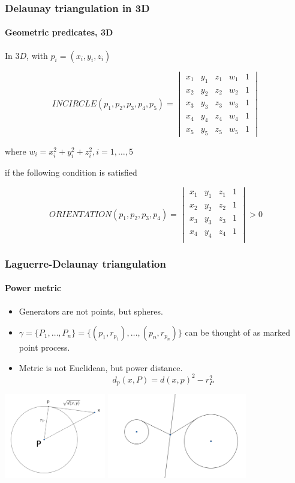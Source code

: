 \documentclass[c, 10pt]{beamer}
\begin{document}
\begin{frame}\frametitle{Delaunay triangulation in 3D}\framesubtitle{Geometric predicates, 3D}

In $3D$, with $p_i = ( x_i, y_i, z_i)$

$$INCIRCLE(p_1,p_2,p_3,p_4, p_5) = \begin{vmatrix} x_1 & y_1 & z_1 & w_1 & 1 \\
x_2 & y_2 & z_2 & w_2 & 1 \\
x_3 & y_3 & z_3 & w_3 & 1 \\
x_4 & y_4 & z_4 & w_4 & 1 \\
x_5 & y_5 & z_5 & w_5 & 1\end{vmatrix}$$

where $w_i = x_i^2  + y_i^2 + z_i^2, i = 1,\dots, 5$

if the following condition is satisfied

$$ORIENTATION(p_1,p_2,p_3,p_4) = 
\begin{vmatrix} 
x_1 & y_1 & z_1 & 1 \\
x_2 & y_2 & z_2 & 1 \\
x_3 & y_3 & z_3 & 1 \\
x_4 & y_4 & z_4 & 1 \\
\end{vmatrix} > 0$$

\end{frame}
\begin{frame}\frametitle{Laguerre-Delaunay triangulation}\framesubtitle{Power metric}
\begin{itemize}
\item Generators are not points, but \alert{spheres}. 
\item $\gamma = \{P_1,\dots, P_n\} = \{(p_1, r_{p_1}), \dots , (p_n, r_{p_n})\}$ can be thought of as \alert{marked point process}.
\item Metric is not Euclidean, but \alert{power distance}.
$$ d_p(x,P) = d(x,p)^2 - r_P^2$$
\end{itemize}

\begin{center}
\includegraphics[height = 3.7cm]{./FigureLayout/powerdistance.png}
\includegraphics[height = 3.7cm]{./FigureLayout/perpendicularbisector.png}
\end{center}

\end{frame}
\end{document}

